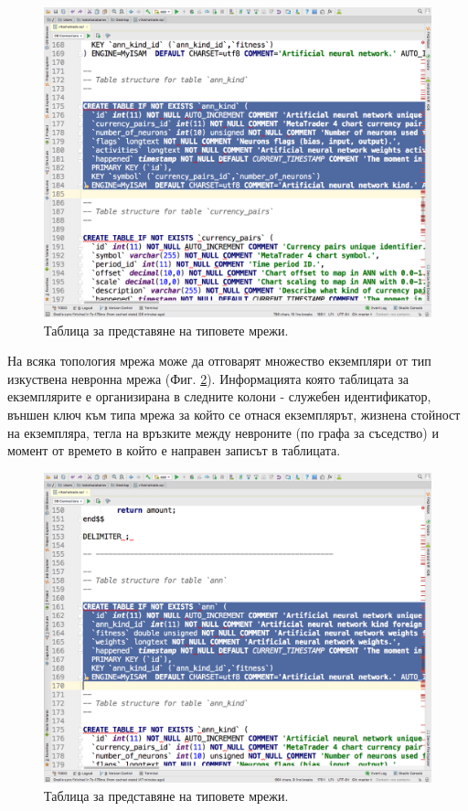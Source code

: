 \documentclass[book,14pt,oneside,openany]{memoir}
\begin{document}
\begin{figure}[h]
  \centering
  \includegraphics[height=0.45\pdfpageheight]{pic0099}
  \caption{Таблица за представяне на типовете мрежи.}
\label{fig:pic0099}
\end{figure}
\FloatBarrier

На всяка топология мрежа може да отговарят множество екземпляри от тип изкуствена невронна мрежа (Фиг. \ref{fig:pic0100}). Информацията която таблицата за екземплярите е организирана в следните колони - служебен идентификатор, външен ключ към типа мрежа за който се отнася екземплярът, жизнена стойност на екземпляра, тегла на връзките между невроните (по графа за съседство) и момент от времето в който е направен записът в таблицата. 

\begin{figure}[h]
  \centering
  \includegraphics[height=0.45\pdfpageheight]{pic0100}
  \caption{Таблица за представяне на типовете мрежи.}
\label{fig:pic0100}
\end{figure}
\FloatBarrier
\end{document}
